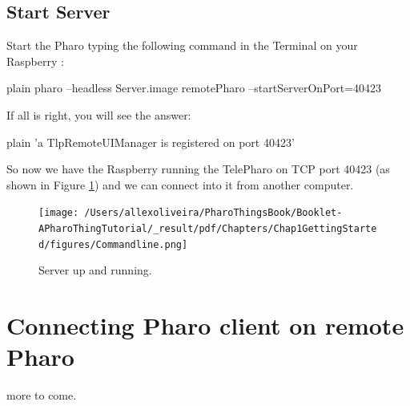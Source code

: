 \documentclass[10pt,twoside,english]{_support/latex/sbabook/sbabook}
\begin{document}
\subsection{Start Server}
Start the Pharo typing the following command in the Terminal on your Raspberry :

\begin{displaycode}{plain}
pharo --headless Server.image remotePharo --startServerOnPort=40423
\end{displaycode}

If all is right, you will see the answer:

\begin{displaycode}{plain}
'a TlpRemoteUIManager is registered on port 40423'
\end{displaycode}

So now we have the Raspberry running the TelePharo on TCP port 40423 (as shown in Figure \ref{Commandline}) and we can connect into it from another computer.


\begin{figure}

\begin{center}
\texttt{[image: /Users/allexoliveira/PharoThingsBook/Booklet-APharoThingTutorial/\_result/pdf/Chapters/Chap1GettingStarted/figures/Commandline.png]}\caption{Server up and running.\label{Commandline}}\end{center}
\end{figure}

\section{Connecting Pharo client on remote Pharo}
more to come.


\backmatter

\end{document}
